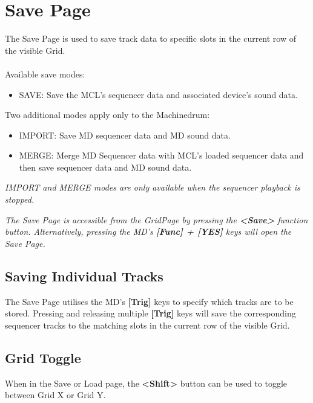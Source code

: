\chapter{Save Page}

The Save Page is used to save track data to specific slots in the current row of the visible  Grid.\\
\\
Available save modes:
\begin{itemize}
    \item SAVE: Save the MCL's sequencer data and associated device's sound data.
\end{itemize}
Two additional modes apply only to the Machinedrum:
\begin{itemize}
    \item IMPORT: Save MD sequencer data and MD sound data. 
    \item MERGE: Merge MD Sequencer data with MCL's loaded sequencer data and then save sequencer data and MD sound data.
\end{itemize}
\textit{IMPORT and MERGE modes are only available when the sequencer playback is stopped.}
\\



\textit{The Save Page is accessible from the GridPage by pressing the \textbf{<Save>} function button. Alternatively, pressing the MD's \textbf{[Func] + [YES]} keys will open the Save Page.}

\newpage
\section{Saving Individual Tracks}
The Save Page utilises the MD's \textbf{[Trig]} keys to specify which tracks are to be stored. Pressing and releasing multiple \textbf{[Trig]} keys will  save the corresponding sequencer tracks to the matching slots in the current row of the visible Grid.
\section{Grid Toggle}
When in the Save or Load page, the \textbf{<Shift>} button can be used to toggle between Grid X or Grid Y.

